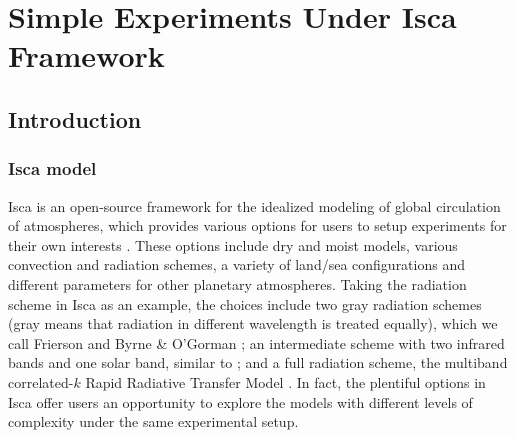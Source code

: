 \chapter{Simple Experiments Under Isca Framework}
\label{ch:polaramplification}


\section{Introduction}

\subsection{Isca model}

Isca is an open-source framework for the idealized modeling of global circulation of atmospheres, which provides various options for users to setup experiments for their own interests \citep{Vallis2018}. These options include dry and moist models, various convection and radiation schemes, a variety of land/sea configurations and different parameters for other planetary atmospheres. Taking the radiation scheme in Isca as an example, the choices include two gray radiation schemes (gray means that radiation in different wavelength is treated equally), which we call Frierson \citep{Frierson2006} and Byrne \& O'Gorman \citep[BOG hereafter;][]{Byrne2013}; an intermediate scheme with two infrared bands and one solar band, similar to \cite{Geen2016}; and a full radiation scheme, the multiband correlated-$k$ Rapid Radiative Transfer Model \citep[RRTM;][]{Clough2005}. In fact, the plentiful options in Isca offer users an opportunity to explore the models with different levels of complexity under the same experimental setup.


